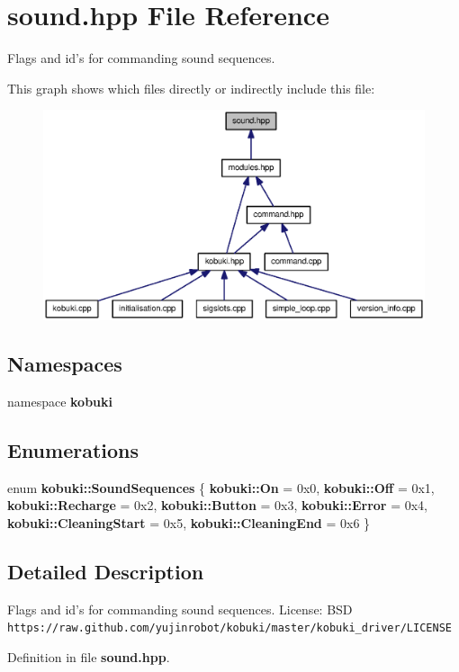 \section{sound.\-hpp \-File \-Reference}
\label{sound_8hpp}


\-Flags and id's for commanding sound sequences.  


\-This graph shows which files directly or indirectly include this file\-:
\nopagebreak
\begin{figure}[H]
\begin{center}
\leavevmode
\includegraphics[width=350pt]{sound_8hpp__dep__incl}
\end{center}
\end{figure}
\subsection*{\-Namespaces}
\begin{DoxyCompactItemize}
\item 
namespace {\bf kobuki}
\end{DoxyCompactItemize}
\subsection*{\-Enumerations}
\begin{DoxyCompactItemize}
\item 
enum {\bf kobuki\-::\-Sound\-Sequences} \{ \*
{\bf kobuki\-::\-On} =  0x0, 
{\bf kobuki\-::\-Off} =  0x1, 
{\bf kobuki\-::\-Recharge} =  0x2, 
{\bf kobuki\-::\-Button} =  0x3, 
\*
{\bf kobuki\-::\-Error} =  0x4, 
{\bf kobuki\-::\-Cleaning\-Start} =  0x5, 
{\bf kobuki\-::\-Cleaning\-End} =  0x6
 \}
\end{DoxyCompactItemize}


\subsection{\-Detailed \-Description}
\-Flags and id's for commanding sound sequences. \-License\-: \-B\-S\-D {\tt https\-://raw.\-github.\-com/yujinrobot/kobuki/master/kobuki\-\_\-driver/\-L\-I\-C\-E\-N\-S\-E} 

\-Definition in file {\bf sound.\-hpp}.

